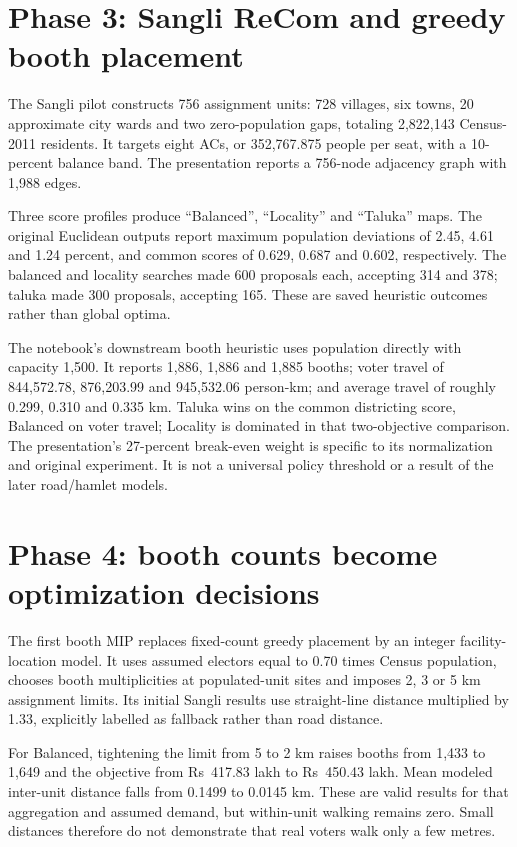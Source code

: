 \documentclass[11pt,a4paper,oneside]{report}
\newcommand{\source}[1]{\par\nopagebreak[4]{\footnotesize\color{teal}Evidence: #1.}\par}
\begin{document}
\section{Phase 3: Sangli ReCom and greedy booth placement}
The Sangli pilot constructs 756 assignment units: 728 villages, six towns, 20 approximate city wards and two zero-population gaps, totaling 2,822,143 Census-2011 residents. It targets eight ACs, or 352,767.875 people per seat, with a 10-percent balance band. The presentation reports a 756-node adjacency graph with 1,988 edges.

Three score profiles produce ``Balanced'', ``Locality'' and ``Taluka'' maps. The original Euclidean outputs report maximum population deviations of 2.45, 4.61 and 1.24 percent, and common scores of 0.629, 0.687 and 0.602, respectively. The balanced and locality searches made 600 proposals each, accepting 314 and 378; taluka made 300 proposals, accepting 165. These are saved heuristic outcomes rather than global optima.

The notebook's downstream booth heuristic uses population directly with capacity 1,500. It reports 1,886, 1,886 and 1,885 booths; voter travel of 844,572.78, 876,203.99 and 945,532.06 person-km; and average travel of roughly 0.299, 0.310 and 0.335 km. Taluka wins on the common districting score, Balanced on voter travel; Locality is dominated in that two-objective comparison. The presentation's 27-percent break-even weight is specific to its normalization and original experiment. It is not a universal policy threshold or a result of the later road/hamlet models.
\source{[S1], [S2], [S3]}

\section{Phase 4: booth counts become optimization decisions}
The first booth MIP replaces fixed-count greedy placement by an integer facility-location model. It uses assumed electors equal to 0.70 times Census population, chooses booth multiplicities at populated-unit sites and imposes 2, 3 or 5 km assignment limits. Its initial Sangli results use straight-line distance multiplied by 1.33, explicitly labelled as fallback rather than road distance.

For Balanced, tightening the limit from 5 to 2 km raises booths from 1,433 to 1,649 and the objective from Rs~417.83 lakh to Rs~450.43 lakh. Mean modeled inter-unit distance falls from 0.1499 to 0.0145 km. These are valid results for that aggregation and assumed demand, but within-unit walking remains zero. Small distances therefore do not demonstrate that real voters walk only a few metres.
\source{[S3]}
\end{document}
